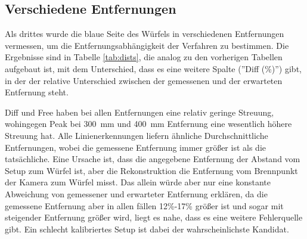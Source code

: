 \documentclass[ngerman,a4paper,parskip=half]{scrartcl}
\begin{document}
\subsection{Verschiedene Entfernungen}
\label{sec:dists}

Als drittes wurde die blaue Seite des Würfels in verschiedenen Entfernungen vermessen, um die Entfernungsabhängigkeit der Verfahren zu bestimmen. Die Ergebnisse sind in Tabelle \ref{tab:dists}, die analog zu den vorherigen Tabellen aufgebaut ist, mit dem Unterschied, dass es eine weitere Spalte (''Diff (\%)'') gibt, in der der relative Unterschied zwischen der gemessenen und der erwarteten Entfernung steht.

Diff und Free haben bei allen Entfernungen eine relativ geringe Streuung, wohingegen Peak bei 300~mm und 400~mm Entfernung eine wesentlich höhere Streuung hat. Alle Linienerkennungen liefern ähnliche Durchschnittliche Entfernungen, wobei die gemessene Entfernung immer größer ist als die tatsächliche. Eine Ursache ist, dass die angegebene Entfernung der Abstand vom Setup zum Würfel ist, aber die Rekonstruktion die Entfernung vom Brennpunkt der Kamera zum Würfel misst. Das allein würde aber nur eine konstante Abweichung von gemessener und erwarteter Entfernung erklären, da die gemessene Entfernung aber in allen fällen 12\%-17\% größer ist und sogar mit steigender Entfernung größer wird, liegt es nahe, dass es eine weitere Fehlerquelle gibt. Ein schlecht kalibriertes Setup ist dabei der wahrscheinlichste Kandidat.
\end{document}
